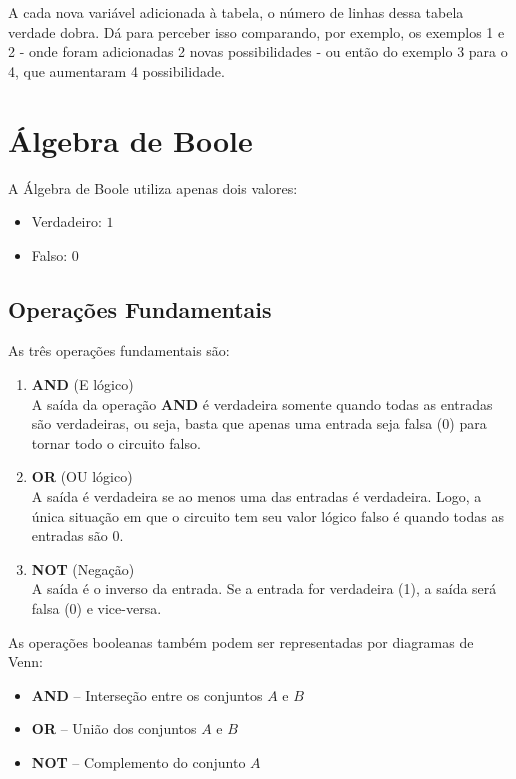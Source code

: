 \documentclass[12pt]{article}
\begin{document}
\begin{tcolorbox}[mynote, title= Observação: números de linhas da Tabela Verdade]
A cada nova variável adicionada à tabela, o número de linhas dessa tabela verdade dobra. Dá para perceber isso comparando, por exemplo, os exemplos 1 e 2 - onde foram adicionadas 2 novas possibilidades - ou então do exemplo 3 para o 4, que aumentaram 4 possibilidade.  
\end{tcolorbox}

\section{Álgebra de Boole}

A Álgebra de Boole utiliza apenas dois valores:
\begin{itemize}
   \item Verdadeiro: $1$
   \item Falso: $0$
\end{itemize}

\subsection{Operações Fundamentais}
As três operações fundamentais são:

\begin{enumerate}
   \item \textbf{AND} (E lógico) \\
   A saída da operação \textbf{AND} é verdadeira somente quando todas as entradas são verdadeiras, ou seja, basta que apenas uma entrada seja falsa (0) para tornar todo o circuito falso. 
   \item \textbf{OR} (OU lógico) \\
   A saída é verdadeira se ao menos uma das entradas é verdadeira. Logo, a única situação em que o circuito tem seu valor lógico falso é quando todas as entradas são 0.
   \item \textbf{NOT} (Negação) \\
   A saída é o inverso da entrada. Se a entrada for verdadeira (1), a saída será falsa (0) e vice-versa.
\end{enumerate} 

\begin{tcolorbox}[mynote, title= Observação: Relação com Diagrama de Venn]
As operações booleanas também podem ser representadas por diagramas de Venn:
\begin{itemize}
   \item \textbf{AND} – Interseção entre os conjuntos $A$ e $B$
   \item \textbf{OR} – União dos conjuntos $A$ e $B$
   \item \textbf{NOT} – Complemento do conjunto $A$
\end{itemize}
\end{tcolorbox}
\end{document}

